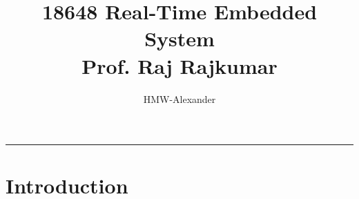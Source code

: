 \documentclass[letterpaper,11pt]{article}
\title{\textbf{18648 Real-Time Embedded System\\Prof. Raj Rajkumar}}
\author{HMW-Alexander}
\begin{document}
	
\maketitle

\tableofcontents

\begin{center}\rule{\textwidth}{1pt}\end{center}
\section{Introduction}
\end{document}
